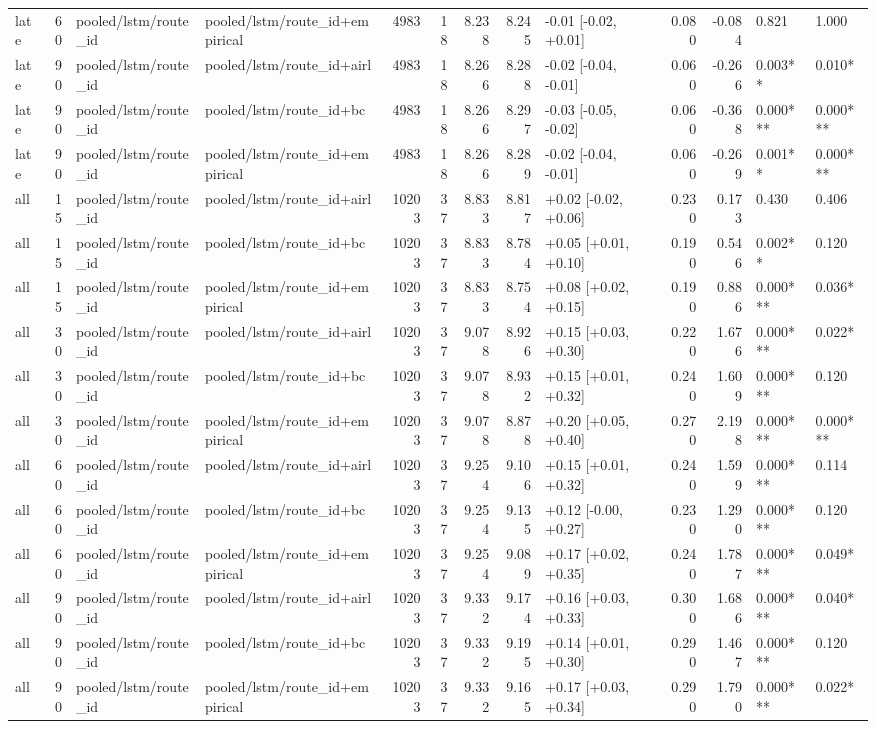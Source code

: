 \begin{tabular}{lrllrrrrlrrll}
late & 60 & pooled/lstm/route_id & pooled/lstm/route_id+empirical & 4983 & 18 & 8.238 & 8.245 & -0.01 [-0.02, +0.01] & 0.080 & -0.084 & 0.821 & 1.000 \\
late & 90 & pooled/lstm/route_id & pooled/lstm/route_id+airl & 4983 & 18 & 8.266 & 8.288 & -0.02 [-0.04, -0.01] & 0.060 & -0.266 & 0.003** & 0.010* \\
late & 90 & pooled/lstm/route_id & pooled/lstm/route_id+bc & 4983 & 18 & 8.266 & 8.297 & -0.03 [-0.05, -0.02] & 0.060 & -0.368 & 0.000*** & 0.000*** \\
late & 90 & pooled/lstm/route_id & pooled/lstm/route_id+empirical & 4983 & 18 & 8.266 & 8.289 & -0.02 [-0.04, -0.01] & 0.060 & -0.269 & 0.001** & 0.000*** \\
all & 15 & pooled/lstm/route_id & pooled/lstm/route_id+airl & 10203 & 37 & 8.833 & 8.817 & +0.02 [-0.02, +0.06] & 0.230 & 0.173 & 0.430 & 0.406 \\
all & 15 & pooled/lstm/route_id & pooled/lstm/route_id+bc & 10203 & 37 & 8.833 & 8.784 & +0.05 [+0.01, +0.10] & 0.190 & 0.546 & 0.002** & 0.120 \\
all & 15 & pooled/lstm/route_id & pooled/lstm/route_id+empirical & 10203 & 37 & 8.833 & 8.754 & +0.08 [+0.02, +0.15] & 0.190 & 0.886 & 0.000*** & 0.036* \\
all & 30 & pooled/lstm/route_id & pooled/lstm/route_id+airl & 10203 & 37 & 9.078 & 8.926 & +0.15 [+0.03, +0.30] & 0.220 & 1.676 & 0.000*** & 0.022* \\
all & 30 & pooled/lstm/route_id & pooled/lstm/route_id+bc & 10203 & 37 & 9.078 & 8.932 & +0.15 [+0.01, +0.32] & 0.240 & 1.609 & 0.000*** & 0.120 \\
all & 30 & pooled/lstm/route_id & pooled/lstm/route_id+empirical & 10203 & 37 & 9.078 & 8.878 & +0.20 [+0.05, +0.40] & 0.270 & 2.198 & 0.000*** & 0.000*** \\
all & 60 & pooled/lstm/route_id & pooled/lstm/route_id+airl & 10203 & 37 & 9.254 & 9.106 & +0.15 [+0.01, +0.32] & 0.240 & 1.599 & 0.000*** & 0.114 \\
all & 60 & pooled/lstm/route_id & pooled/lstm/route_id+bc & 10203 & 37 & 9.254 & 9.135 & +0.12 [-0.00, +0.27] & 0.230 & 1.290 & 0.000*** & 0.120 \\
all & 60 & pooled/lstm/route_id & pooled/lstm/route_id+empirical & 10203 & 37 & 9.254 & 9.089 & +0.17 [+0.02, +0.35] & 0.240 & 1.787 & 0.000*** & 0.049* \\
all & 90 & pooled/lstm/route_id & pooled/lstm/route_id+airl & 10203 & 37 & 9.332 & 9.174 & +0.16 [+0.03, +0.33] & 0.300 & 1.686 & 0.000*** & 0.040* \\
all & 90 & pooled/lstm/route_id & pooled/lstm/route_id+bc & 10203 & 37 & 9.332 & 9.195 & +0.14 [+0.01, +0.30] & 0.290 & 1.467 & 0.000*** & 0.120 \\
all & 90 & pooled/lstm/route_id & pooled/lstm/route_id+empirical & 10203 & 37 & 9.332 & 9.165 & +0.17 [+0.03, +0.34] & 0.290 & 1.790 & 0.000*** & 0.022* \\
\bottomrule
\end{tabular}
